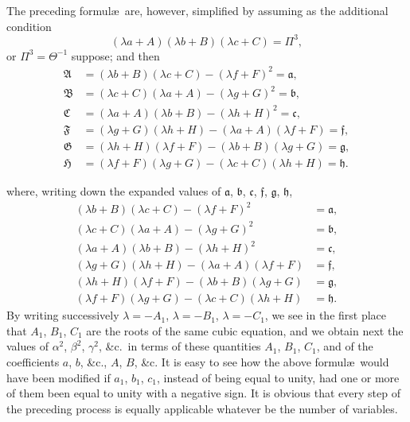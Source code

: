 \documentclass[11pt,a4paper]{article}
\theoremstyle{definition}
\begin{document}
The preceding formul\ae\ are, however, simplified by assuming as the additional condition
\[
(\lambda a + A)(\lambda b + B)(\lambda c + C) = \Pi^{3},
\]
or $\Pi^{3} = \Theta^{-1}$ suppose; and then
\begin{align*}
\mathfrak{A} &= (\lambda b + B)(\lambda c + C) - (\lambda f + F)^{2} = \mathfrak{a}, \\
\mathfrak{B} &= (\lambda c + C)(\lambda a + A) - (\lambda g + G)^{2} = \mathfrak{b}, \\
\mathfrak{C} &= (\lambda a + A)(\lambda b + B) - (\lambda h + H)^{2} = \mathfrak{c}, \\
\mathfrak{F} &= (\lambda g + G)(\lambda h + H) - (\lambda a + A)(\lambda f + F) = \mathfrak{f}, \\
\mathfrak{G} &= (\lambda h + H)(\lambda f + F) - (\lambda b + B)(\lambda g + G) = \mathfrak{g}, \\
\mathfrak{H} &= (\lambda f + F)(\lambda g + G) - (\lambda c + C)(\lambda h + H) = \mathfrak{h}.
\end{align*}

\newpage

\setcounter{page}{431}

where, writing down the expanded values of $\mathfrak{a}$, $\mathfrak{b}$, $\mathfrak{c}$, $\mathfrak{f}$, $\mathfrak{g}$, $\mathfrak{h}$,
\begin{align*}
(\lambda b + B)(\lambda c + C) - (\lambda f + F)^{2} &= \mathfrak{a}, \\
(\lambda c + C)(\lambda a + A) - (\lambda g + G)^{2} &= \mathfrak{b}, \\
(\lambda a + A)(\lambda b + B) - (\lambda h + H)^{2} &= \mathfrak{c}, \\
(\lambda g + G)(\lambda h + H) - (\lambda a + A)(\lambda f + F) &= \mathfrak{f}, \\
(\lambda h + H)(\lambda f + F) - (\lambda b + B)(\lambda g + G) &= \mathfrak{g}, \\
(\lambda f + F)(\lambda g + G) - (\lambda c + C)(\lambda h + H) &= \mathfrak{h}.
\end{align*}
By writing successively $\lambda = -A_{1}$, $\lambda = -B_{1}$, $\lambda = -C_{1}$, we see in the first place that $A_{1}$, $B_{1}$, $C_{1}$ are the roots of the same cubic equation, and we obtain next the values of $\alpha^{2}$, $\beta^{2}$, $\gamma^{2}$, \&c.\ in terms of these quantities $A_{1}$, $B_{1}$, $C_{1}$, and of the coefficients $a$, $b$, \&c., $A$, $B$, \&c. It is easy to see how the above formul\ae\ would have been modified if $a_{1}$, $b_{1}$, $c_{1}$, instead of being equal to unity, had one or more of them been equal to unity with a negative sign. It is obvious that every step of the preceding process is equally applicable whatever be the number of variables.
\end{document}
